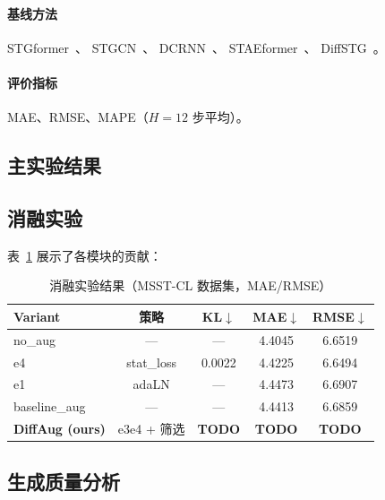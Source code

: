 \documentclass[12pt]{article}
\begin{document}
\paragraph{基线方法}
STGformer~\cite{stgformer}、
STGCN~\cite{stgcn}、
DCRNN~\cite{dcrnn}、
STAEformer~\cite{staeformer}、
DiffSTG~\cite{diffstg}。

\paragraph{评价指标}
MAE、RMSE、MAPE（$H=12$ 步平均）。

\subsection{主实验结果}

\subsection{消融实验}

表~\ref{tab:ablation} 展示了各模块的贡献：
\begin{table}[ht]
  \centering
  \caption{消融实验结果（MSST-CL 数据集，MAE/RMSE）}
  \label{tab:ablation}
  \begin{tabular}{lcccc}
    \toprule
    \textbf{Variant} & \textbf{策略} & \textbf{KL}$\downarrow$ & \textbf{MAE}$\downarrow$ & \textbf{RMSE}$\downarrow$ \\
    \midrule
    no\_aug       & —                & —      & 4.4045 & 6.6519 \\
    e4            & stat\_loss       & 0.0022 & 4.4225 & 6.6494 \\
    e1            & adaLN            & —      & 4.4473 & 6.6907 \\
    baseline\_aug & —                & —      & 4.4413 & 6.6859 \\
    \midrule
    \textbf{DiffAug (ours)} & e3e4 + 筛选 & \textbf{TODO} & \textbf{TODO} & \textbf{TODO} \\
    \bottomrule
  \end{tabular}
\end{table}

\subsection{生成质量分析}

\end{document}
